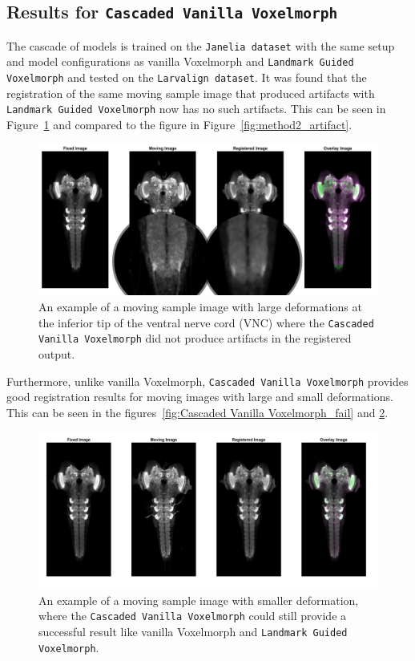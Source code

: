 \documentclass{book}
\begin{document}
	\subsection{Results for \texttt{Cascaded Vanilla Voxelmorph}}
	The cascade of models is trained on the \texttt{Janelia dataset} with the same setup and model configurations as vanilla Voxelmorph and \texttt{Landmark Guided Voxelmorph} and tested on the \texttt{Larvalign dataset}. It was found that the registration of the same moving sample image that produced artifacts with \texttt{Landmark Guided Voxelmorph} now has no such artifacts. This can be seen in Figure~\ref{fig:Cascaded Vanilla Voxelmorph_artifact} and compared to the figure in Figure~\ref{fig:method2_artifact}.
	
	\begin{figure}[h!]
		\centering
		\includegraphics[width=0.9\columnwidth]{resources/chapter4/method3/compare/np_52B07_52H01_MB262B_021713B_scaled.png}
		\caption{An example of a moving sample image with large deformations at the inferior tip of the ventral nerve cord (VNC) where the \texttt{Cascaded Vanilla Voxelmorph} did not produce artifacts in the registered output.}
		\label{fig:Cascaded Vanilla Voxelmorph_artifact}
	\end{figure}
	
	Furthermore, unlike vanilla Voxelmorph, \texttt{Cascaded Vanilla Voxelmorph} provides good registration results for moving images with large and small deformations. This can be seen in the figures~\ref{fig:Cascaded Vanilla Voxelmorph_fail} and \ref{fig:Cascaded Vanilla Voxelmorph_pas}.
	
	\begin{figure}[h!]
		\centering
		\includegraphics[width=0.9\columnwidth]{resources/chapter4/method3/compare/np_brain7_scaled.tif.png}
		\caption{An example of a moving sample image with smaller deformation, where the \texttt{Cascaded Vanilla Voxelmorph} could still provide a successful result like vanilla Voxelmorph and \texttt{Landmark Guided Voxelmorph}.}
		\label{fig:Cascaded Vanilla Voxelmorph_pas}
	\end{figure}
	
\end{document}

